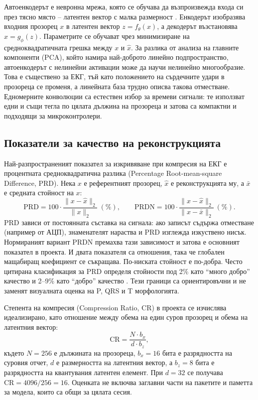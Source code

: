 \documentclass[12pt,a4paper]{article}
\begin{document}
Автоенкодерът е невронна мрежа, която се обучава да възпроизвежда входа си през тясно място -- латентен вектор с малка размерност \cite{hinton2006reducing}. Енкодерът изобразява входния прозорец \(x\) в латентен вектор \(z = f_\theta(x)\), а декодерът възстановява \(\hat{x} = g_\phi(z)\). Параметрите се обучават чрез минимизиране на средноквадратичната грешка между \(x\) и \(\hat{x}\). За разлика от анализа на главните компоненти (PCA), който намира най-доброто линейно подпространство, автоенкодерът с нелинейни активации може да научи нелинейно многообразие. Това е съществено за ЕКГ, тъй като положението на сърдечните удари в прозореца се променя, а линейната база трудно описва такова отместване. Едномерните конволюции са естествен избор за времеви сигнали: те използват едни и същи тегла по цялата дължина на прозореца и затова са компактни и подходящи за микроконтролери.

\subsection{Показатели за качество на реконструкцията}
Най-разпространеният показател за изкривяване при компресия на ЕКГ е процентната средноквадратична разлика (Percentage Root-mean-square Difference, PRD). Нека \(x\) е референтният прозорец, \(\hat{x}\) е реконструкцията му, а \(\bar{x}\) е средната стойност на \(x\):
\begin{equation}
    \mathrm{PRD} = 100 \cdot \frac{\lVert x - \hat{x} \rVert_2}{\lVert x \rVert_2}\ (\%),
    \qquad
    \mathrm{PRDN} = 100 \cdot \frac{\lVert x - \hat{x} \rVert_2}{\lVert x - \bar{x} \rVert_2}\ (\%).
    \label{eq:prd}
\end{equation}
PRD зависи от постоянната съставка на сигнала: ако записът съдържа отместване (например от АЦП), знаменателят нараства и PRD изглежда изкуствено нисък. Нормираният вариант PRDN премахва тази зависимост и затова е основният показател в проекта. И двата показателя са отношения, така че глобален мащабиращ коефициент се съкращава. По-ниската стойност е по-добра. Често цитирана класификация за PRD определя стойности под 2\% като \enquote{много добро} качество и 2--9\% като \enquote{добро} качество \cite{zigel2000wdd}. Тези граници са ориентировъчни и не заменят визуалната оценка на P, QRS и T морфологията.

Степента на компресия (Compression Ratio, CR) в проекта се изчислява идеализирано, като отношение между обема на един суров прозорец и обема на латентния вектор:
\begin{equation}
    \mathrm{CR} = \frac{N \cdot b_x}{d \cdot b_z},
    \label{eq:cr}
\end{equation}
където \(N = 256\) е дължината на прозореца, \(b_x = 16\) бита е разрядността на суровия отчет, \(d\) е размерността на латентния вектор, а \(b_z = 8\) бита е разрядността на квантувания латентен елемент. При \(d = 32\) се получава \(\mathrm{CR} = 4096/256 = 16\). Оценката не включва заглавни части на пакетите и паметта за модела, които са общи за цялата сесия.
\end{document}
